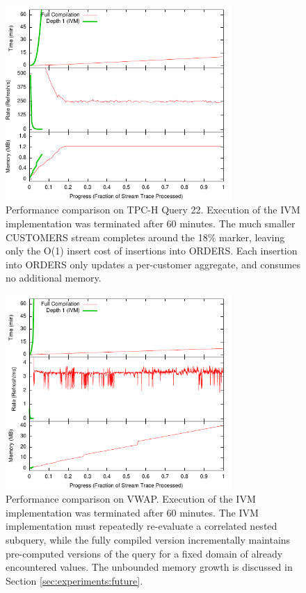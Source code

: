 \begin{figure}
\begin{center}
\includegraphics[width=3.4in]{../graphs/graphs/unified_tpch22.pdf}
\caption{Performance comparison on TPC-H Query 22.  Execution of the IVM implementation was terminated after 60 minutes.  The much smaller CUSTOMERS stream completes around the 18\% marker, leaving only the O(1) insert cost of insertions into ORDERS.  Each insertion into ORDERS only updates a per-customer aggregate, and consumes no additional memory.}
\label{fig:experiments:tpch22}
\end{center}
\end{figure}

\begin{figure}
\begin{center}
\includegraphics[width=3.4in]{../graphs/graphs/unified_vwap.pdf}
\caption{Performance comparison on VWAP.  Execution of the IVM implementation was terminated after 60 minutes.  The IVM implementation must repeatedly re-evaluate a correlated nested subquery, while the fully compiled version incrementally maintains pre-computed versions of the query for a fixed domain of already encountered values.  The unbounded memory growth is discussed in Section \ref{sec:experiments:future}.}
\label{fig:experiments:vwap}
\end{center}
\end{figure}


